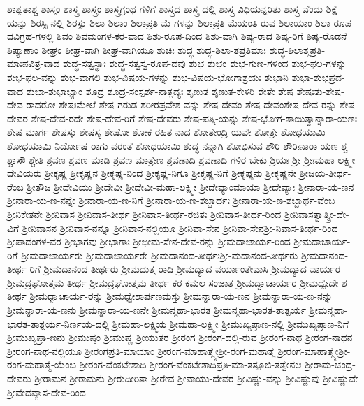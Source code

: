 {ಶಾಶ್ವತಾಶ್ಚ
ಶಾಸ್ತಂ
ಶಾಸ್ತ್ರ
ಶಾಸ್ತ್ರಂ
ಶಾಸ್ತ್ರಗ್ರಂಥ-ಗಳಿಗೆ
ಶಾಸ್ತ್ರದ
ಶಾಸ್ತ್ರ-ದಲ್ಲಿ
ಶಾಸ್ತ್ರ-ವಿಧಿಯನ್ನರಿತು
ಶಾಸ್ತ್ರ-ವೆಂದು
ಶಿಕ್ಷೆ-ಯನ್ನು
ಶಿರಸ್ಸಿ-ನಲ್ಲಿ
ಶಿರಸ್ಸು
ಶಿಲಾ
ಶಿಲಾಂ
ಶಿಲಾಪ್ರತಿ-ಮೆ-ಗಳನ್ನು
ಶಿಲಾಪ್ರತಿ-ಮೆಯಂತಿ-ರುವ
ಶಿಲಾಯಾಂ
ಶಿಲಾ-ರೂಪ-ದವಿಗ್ರಹ-ಗಳಲ್ಲಿ
ಶಿವಂ
ಶಿವಮಂಗಳ-ಕರ-ವಾದ
ಶಿಶು-ರೂಪ-ದಿಂದ
ಶಿಶು-ವಾಗಿ
ಶಿಷ್ಯ-ರಾದ
ಶಿಷ್ಯ-ರಿಗೆ
ಶಿಷ್ಯ-ರೊಡನೆ
ಶಿಷ್ಯಾಣಾಂ
ಶೀಘ್ರಂ
ಶೀಘ್ರ-ವಾಗಿ
ಶೀಘ್ರ-ವಾಗಿಯೂ
ಶುಚಿಃ
ಶುದ್ಧ
ಶುದ್ಧ-ಶಿಲಾ-ತಪ್ರತಿಮಾಃ
ಶುದ್ಧ-ಶಿಲಾತ್ಮಪ್ರತಿ-ಮಾಃಪವಿತ್ರ-ವಾದ
ಶುದ್ಧ-ಸತ್ವಸ್ಥಾಃ
ಶುದ್ಧ-ಸತ್ವಸ್ವ-ರೂಪ-ದವು
ಶುಭ
ಶುಭಂ
ಶುಭ-ಗುಣ-ಗಳಿಂದ
ಶುಭ-ಫಲ-ಗಳನ್ನು
ಶುಭ-ಫಲ-ವನ್ನು
ಶುಭ-ವಾಗಲಿ
ಶುಭ-ವಿಷಯ-ಗಳನ್ನು
ಶುಭ-ವಿಷಯ-ಭೋಗಾಶ್ರಯಃ
ಶುಭಾನಿ
ಶುಭಾ-ಶುಭಪ್ರದ-ವಾದ
ಶುಭಾ-ಶುಭಾಭ್ಯಾಂ
ಶೂದ್ರ
ಶೂದ್ರ-ಸಂಸ್ಪರ್ಶ-ನಾತ್ಸದ್ಯಃ
ಶೃಣುತ
ಶೃಣುತ-ಕೇಳಿರಿ
ಶೇತೇ
ಶೇಷ
ಶೇಷಃತು-ಶೇಷ-ದೇವ-ರಾದರೋ
ಶೇಷಃಮೇಲೆ
ಶೇಷ-ಗರುಡ-ಶರೀರಪ್ರವೇಶ-ವನ್ನು
ಶೇಷ-ದೇವಂ
ಶೇಷ-ದೇವಂಶೇಷ-ದೇವ-ರನ್ನು
ಶೇಷ-ದೇವರ
ಶೇಷ-ದೇವ-ರದೇ
ಶೇಷ-ದೇವ-ರಿಗೆ
ಶೇಷ-ದೇವರು
ಶೇಷ-ಪತ್ನಿ-ಯನ್ನು
ಶೇಷ-ಭೋಗ-ಶಾಯಿತ್ವಾನ್ನಾರಾ-ಯಣಃ
ಶೇಷ-ಮಾರ್ಗ
ಶೇಷಸ್ತು
ಶೇಷಸ್ಯ
ಶೇಷೋ
ಶೋಕ-ರಹಿತ-ನಾದ
ಶೋತೇಂದ್ರಿ-ಯವೇ
ಶೋತ್ರೇ
ಶೋಧಯಾಮಿ
ಶೋಧಯಾಮಿ-ನಿರ್ದೋಷ-ರಾಗು-ವರಂತೆ
ಶೋಧಯಾಮಿ-ಶುದ್ಧ-ನನ್ನಾಗಿ
ಶೋಭಿಸುವ
ಶೌರಿ
ಶೌರಿಃನಾರಾ-ಯಣ
ಶ್ಚ
ಶ್ಚಾಸೌ
ಶ್ಚೇತಿ
ಶ್ರವಣ
ಶ್ರವಣ-ಮಾಡಿ
ಶ್ರವಣ-ಮಾತ್ರೇಣ
ಶ್ರವಣಾದಿ
ಶ್ರವಣಾದಿ-ಗಳಿರ-ಬೇಕು
ಶ್ರಿಯಃ
ಶ್ರೀ
ಶ್ರೀಃಮಹಾ-ಲಕ್ಷ್ಮೀ-ದೇವಿಯರು
ಶ್ರೀಕೃಷ್ಣ
ಶ್ರೀಕೃಷ್ಣನ
ಶ್ರೀಕೃಷ್ಣ-ನಿಂದ
ಶ್ರೀಕೃಷ್ಣ-ನಿಗೂ
ಶ್ರೀಕೃಷ್ಣ-ನಿಗೆ
ಶ್ರೀಕೃಷ್ಣನು
ಶ್ರೀಕೃಷ್ಣನೇ
ಶ್ರೀಜಯ-ತೀರ್ಥ-ರೆಂಬ
ಶ್ರೀತೌಜ
ಶ್ರೀದೇವಿಯು
ಶ್ರೀದೇವೀ
ಶ್ರೀದೇವೀ-ಮಹಾ-ಲಕ್ಷ್ಮೀ
ಶ್ರೀದೇವ್ಯಾಂಮಾಯಾ
ಶ್ರೀದೇವ್ಯಾಃ
ಶ್ರೀನಾರಾ-ಯ-ಣನ
ಶ್ರೀನಾರಾ-ಯ-ಣ-ನನ್ನೇ
ಶ್ರೀನಾರಾ-ಯ-ಣ-ನಿಗೆ
ಶ್ರೀನಾರಾ-ಯ-ಣ-ಶಬ್ದಾರ್ಥಃ
ಶ್ರೀನಾರಾ-ಯ-ಣ-ಶಬ್ದಾರ್ಥ-ವೆಂಬ
ಶ್ರೀನಿಕೇತನೇ
ಶ್ರೀನಿವಾಸ
ಶ್ರೀನಿವಾಸ-ತೀರ್ಥ
ಶ್ರೀನಿವಾಸ-ತೀರ್ಥ-ರಚಿತಃ
ಶ್ರೀನಿವಾಸ-ತೀರ್ಥ-ರಿಂದ
ಶ್ರೀನಿವಾಸತ್ವಾತ್ಶ್ರೀ-ದೇ-ವಿಗೆ
ಶ್ರೀನಿವಾಸನ
ಶ್ರೀನಿವಾಸ-ನನ್ನೂ
ಶ್ರೀನಿವಾಸ-ನಲ್ಲಿಯೂ
ಶ್ರೀನಿವಾ-ಸೇನ
ಶ್ರೀನಿವಾ-ಸೇನಶ್ರೀ-ನಿವಾಸ-ತೀರ್ಥ-ರಿಂದ
ಶ್ರೀಪಾದಂಗಳ-ವರ
ಶ್ರೀಭಾಗವು
ಶ್ರೀಭಾಗಾಃ
ಶ್ರೀಭೀಮ-ಸೇನ-ದೇವ-ರನ್ನು
ಶ್ರೀಮದಾಚಾರ್ಯ-ರಿಂದ
ಶ್ರೀಮದಾಚಾರ್ಯ-ರಿಗೆ
ಶ್ರೀಮದಾಚಾರ್ಯರು
ಶ್ರೀಮದಾಚಾರ್ಯರೇ
ಶ್ರೀಮದಾನಂದ-ತೀರ್ಥಃಶ್ರೀ-ಮದಾನಂದ-ತೀರ್ಥರು
ಶ್ರೀಮದಾನಂದ-ತೀರ್ಥ-ರಿಗೆ
ಶ್ರೀಮದಾನಂದ-ತೀರ್ಥರು
ಶ್ರೀಮದುತ್ತ-ರಾದಿ
ಶ್ರೀಮದ್ಯಾದ-ವರ್ಯಾಂತೇವಾಸಿ
ಶ್ರೀಮದ್ಯಾದ-ವಾರ್ಯರ
ಶ್ರೀಮದ್ರಘೋತ್ತಮ-ತೀರ್ಥ
ಶ್ರೀಮದ್ರಘೋತ್ತಮ-ತೀರ್ಥ-ಕರ-ಕಮಲ-ಸಂಜಾತ
ಶ್ರೀಮದ್ವಾಚಾರ್ಯರ
ಶ್ರೀಮದ್ವೇದೇ-ಶ-ತೀರ್ಥ
ಶ್ರೀಮಧ್ವಾಚಾರ್ಯ-ರನ್ನು
ಶ್ರೀಮಧ್ವೇಶಾರ್ಪಣಮಸ್ತು
ಶ್ರೀಮನ್ನಾರಾ-ಯ-ಣನ
ಶ್ರೀಮನ್ನಾರಾ-ಯ-ಣ-ನನ್ನು
ಶ್ರೀಮನ್ನಾರಾ-ಯ-ಣನು
ಶ್ರೀಮನ್ನಾರಾ-ಯ-ಣನೇ
ಶ್ರೀಮನ್ಮಹಾ-ಭಾರತ
ಶ್ರೀಮನ್ಮಹಾ-ಭಾರತ-ತಾತ್ಪರ್ಯ
ಶ್ರೀಮನ್ಮಹಾ-ಭಾರತ-ತಾತ್ಪರ್ಯ-ನಿರ್ಣಯ-ದಲ್ಲಿ
ಶ್ರೀಮಹಾ-ಲಕ್ಷ್ಮಿಯ
ಶ್ರೀಮಹಾ-ಲಕ್ಷ್ಮೀ
ಶ್ರೀಮುಖ್ಯಪ್ರಾಣ-ನಲ್ಲಿ
ಶ್ರೀಮುಖ್ಯಪ್ರಾಣ-ನಿಗೆ
ಶ್ರೀಮುಖ್ಯಪ್ರಾ-ಣನು
ಶ್ರೀಮುಷ್ಠಂ
ಶ್ರೀಮುಷ್ಣ
ಶ್ರೀಯುತರ
ಶ್ರೀರಂಗ
ಶ್ರೀರಂಗ-ದಲ್ಲಿ-ರುವ
ಶ್ರೀರಂಗ-ನಾಥ
ಶ್ರೀರಂಗ-ನಾಥನ
ಶ್ರೀರಂಗ-ನಾಥ-ನಲ್ಲಿಯೂ
ಶ್ರೀರಂಗಪ್ರತಿ-ಮಾಯಾಂ
ಶ್ರೀರಂಗ-ಮಾಹಾತ್ಮ್ಯೇಶ್ರೀ-ರಂಗ-ಮಹಾತ್ಮೆ
ಶ್ರೀರಂಗ-ಮಾಹಾತ್ಮ್ಯೇಶ್ರೀ-ರಂಗ-ಮಹಾತ್ಮೆ-ಯೆಂಬ
ಶ್ರೀರಂಗ-ವೆಂಕಟೇಶಾದಿ
ಶ್ರೀರಂಗ-ವೆಂಕಟೇಶಾದಿಪ್ರತಿ-ಮಾ-ತತ್ಪೂಜಿ-ತತ್ವೇನಆ
ಶ್ರೀರಾಮ-ಚಂದ್ರ-ದೇವರು
ಶ್ರೀರಾಮನ
ಶ್ರೀರಾಮನು
ಶ್ರೀರುದೀರಿತಾ
ಶ್ರೀರೇವ
ಶ್ರೀವಾಯು-ದೇವರ
ಶ್ರೀವಿಷ್ಣು-ವನ್ನು
ಶ್ರೀವಿಷ್ಣುವು
ಶ್ರೀವಿಷ್ಣುವೇ
ಶ್ರೀವೇದವ್ಯಾಸ-ದೇವ-ರಿಂದ
}
